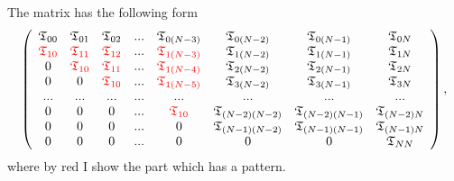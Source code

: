 \documentclass[prd,nofootinbib,eqsecnum,final]{revtex4}
\renewcommand{\(}{\left(}
\renewcommand{\)}{\right)}
\renewcommand{\[}{\left[}
\renewcommand{\]}{\right]}
\newcommand{\red}[1]{{\color[rgb]{1,0,0} #1}}
\begin{document}
The matrix has the following form
\begin{eqnarray}
\left(
\begin{array}{cccccccc}
\mathfrak{T}_{00} & \mathfrak{T}_{01} & \mathfrak{T}_{02} & ... & \mathfrak{T}_{0(N-3)} & \mathfrak{T}_{0(N-2)} & \mathfrak{T}_{0(N-1)} & \mathfrak{T}_{0N}
\\
\red{\mathfrak{T}_{10}} & \red{\mathfrak{T}_{11}} & \red{\mathfrak{T}_{12}} & ... & \red{\mathfrak{T}_{1(N-3)}} & \mathfrak{T}_{1(N-2)} & \mathfrak{T}_{1(N-1)} & \mathfrak{T}_{1N}
\\
0 & \red{\mathfrak{T}_{10}} & \red{\mathfrak{T}_{11}} & ... & \red{\mathfrak{T}_{1(N-4)}} & \mathfrak{T}_{2(N-2)} & \mathfrak{T}_{2(N-1)} & \mathfrak{T}_{2N}
\\
0 & 0 & \red{\mathfrak{T}_{10}} & ... & \red{\mathfrak{T}_{1(N-5)}} & \mathfrak{T}_{3(N-2)} & \mathfrak{T}_{3(N-1)} & \mathfrak{T}_{3N}
\\ ... & ... &... &... &... &... &... &... 
\\
0 & 0 & 0 & ... & \red{\mathfrak{T}_{10}} & \mathfrak{T}_{(N-2)(N-2)} & \mathfrak{T}_{(N-2)(N-1)} & \mathfrak{T}_{(N-2)N}
\\
0 & 0 & 0 & ... & 0 & \mathfrak{T}_{(N-1)(N-2)} & \mathfrak{T}_{(N-1)(N-1)} & \mathfrak{T}_{(N-1)N}
\\
0 & 0 & 0 & ... & 0 & 0 & 0 & \mathfrak{T}_{NN}
\end{array}
\right),
\end{eqnarray}
where by red I show the part which has a pattern.
\end{document}
